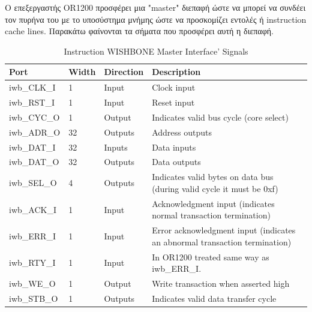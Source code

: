 \documentclass[a4paper,10pt]{article}
\numberwithin{figure}{section}
\numberwithin{table}{section}
\begin{document}
O επεξεργαστής OR1200 προσφέρει μια "master" διεπαφή ώστε να μπορεί να συνδέει τον πυρήνα του με το υποσύστημα μνήμης ώστε να προσκομίζει εντολές ή instruction cache lines. Παρακάτω φαίνονται τα σήματα που προσφέρει αυτή η διεπαφή.
\newpage
{%
\vspace{0.7cm}
\renewcommand{\arraystretch}{1.2}
\setlength{\tabcolsep}{0.3em}
\newcommand{\mc}[3]{\multicolumn{#1}{#2}{#3}}
\begin{table}[h]
\begin{center}
\begin{tabular}{|l|l|l|p{6 cm}|}
\hline
\rowcolor{tcA}
Port & Width & Direction & Description\\\hline
iwb\_CLK\_I & 1 & Input & Clock input\\\hline
iwb\_RST\_I & 1 & Input & Reset input\\\hline
iwb\_CYC\_O & 1 & Output & Indicates valid bus cycle (core select)\\\hline
iwb\_ADR\_O & 32 & Outputs & Address outputs\\\hline
iwb\_DAT\_I & 32 & Inputs & Data inputs\\\hline
iwb\_DAT\_O & 32 & Outputs & Data outputs\\\hline
iwb\_SEL\_O & 4 & Outputs & Indicates valid bytes on data bus (during valid cycle it must be 0xf)\\\hline
iwb\_ACK\_I & 1 & Input & Acknowledgment input (indicates normal transaction termination)\\\hline
iwb\_ERR\_I & 1 & Input & Error acknowledgment input (indicates an abnormal transaction termination)\\\hline
iwb\_RTY\_I & 1 & Input & In OR1200 treated same way as iwb\_ERR\_I.\\\hline
iwb\_WE\_O & 1 & Output & Write transaction when asserted high\\\hline
iwb\_STB\_O & 1 & Outputs & Indicates valid data transfer cycle\\\hline
\end{tabular}
\end{center}
\caption{Instruction WISHBONE Master Interface’ Signals}
\end{table}
\vspace{0.7cm}
}
\end{document}
